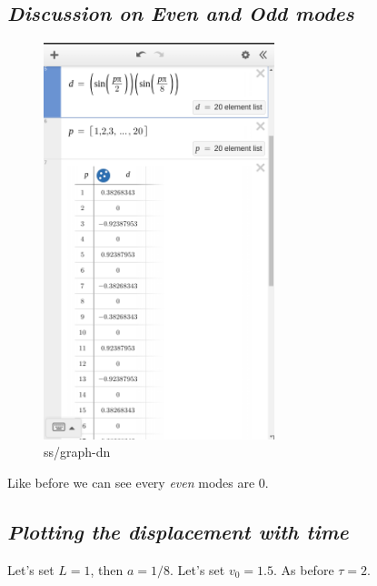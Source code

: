 \documentclass[letter]{article}
\begin{document}
\subsection*{\emph{Discussion on Even and Odd modes}}
\begin{figure}[H]
	\centering
	\includegraphics[width=0.6\textwidth]{ss/graph-dn}
	\caption{ss/graph-dn}
	\label{fig:ss-graph-dn}
\end{figure}
Like before we can see every  \emph{even} modes are 0. 


\subsection*{\emph{Plotting the displacement with time}}
Let's set $L = 1 $, then $a = 1 / 8$. Let's set $v_0 = 1.5$. 
As before $\tau = 2$. 
\newpage
\end{document}
